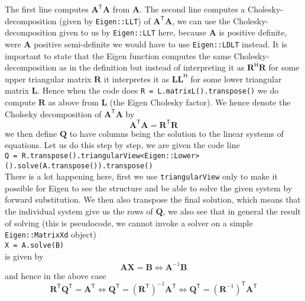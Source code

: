 \documentclass{article}
\newcommand\tr{\mathsf{T}}
\newcommand\hr{\mathsf{H}}
\begin{document}
\noindent The first line computes $\mathbf{A}^{\tr}\mathbf{A}$ from $\mathbf{A}$. The second line computes a Cholesky-decomposition (given by \verb|Eigen::LLT|) of $\mathbf{A}^{\tr}\mathbf{A}$, we can use the Cholesky-decomposition given to us by \verb|Eigen::LLT| here, because $\mathbf{A}$ is positive definite, were $\mathbf{A}$ positive semi-definite we would have to use \verb|Eigen::LDLT| instead. It is important to state that the Eigen function computes the same Cholesky-decomposition as in the definition but instead of interpreting it as $\mathbf{R}^{\hr}\mathbf{R}$ for some upper triangular matrix $\mathbf{
R}$ it interpretes it as $\mathbf{L}\mathbf{L}^{\hr}$ for some lower triangular matrix $\mathbf{L}$.  Hence when the code does \verb|R = L.matrixL().transpose()| we do compute $\mathbf{R}$ as above from $\mathbf{L}$ (the Eigen Cholesky factor). We hence denote the Cholseky decomposition of $\mathbf{A}^{\tr}\mathbf{A}$ by
\begin{equation*}
    \mathbf{A}^{\tr}\mathbf{A} = \mathbf{R}^{\tr}\mathbf{R} 
\end{equation*}
we then define $\mathbf{Q}$ to have columns being the solution to the linear systems of equations. Let us do this step by step, we are given the code line \\[2mm]
\verb|Q = R.transpose().triangularView<Eigen::Lower>().solve(A.transpose()).transpose()|
\\[1mm]
There is a lot happening here, first we use \verb|triangularView| only to make it possible for Eigen to see the structure and be able to solve the given system by forward substitution. We then also transpose the final solution, which means that the individual system give us the rows of $\mathbf{Q}$, we also see that in general the result of solving (this is pseudocode, we cannot invoke a solver on a simple \verb|Eigen::MatrixXd| object) \\[2mm]
\verb|X = A.solve(B)|
\\[1mm]
is given by
\begin{equation*}
    \mathbf{A}\mathbf{X} = \mathbf{B} \Longleftrightarrow \mathbf{A}^{-1}\mathbf{B}
\end{equation*}
and hence in the above case
\begin{equation*}
    \mathbf{R}^{\tr}\mathbf{Q}^{\tr} = \mathbf{A}^{\tr} \Longleftrightarrow \mathbf{Q}^{\tr} = \left(\mathbf{R}^{\tr}\right)^{-1}\mathbf{A}^{\tr} \Longleftrightarrow \mathbf{Q}^{\tr} = \left(\mathbf{R}^{-1}\right)^{\tr}\mathbf{A}^{\tr}
\end{equation*}
\end{document}
